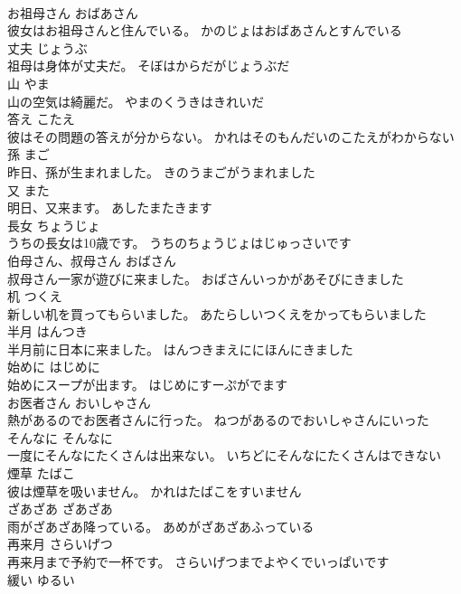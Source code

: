 \documentclass[8pt]{extreport}
\begin{document}
\begin{CJK}{UTF8}{min}
\\	お祖母さん	おばあさん	
\\	彼女はお祖母さんと住んでいる。	かのじょはおばあさんとすんでいる	
\\	丈夫	じょうぶ	
\\	祖母は身体が丈夫だ。	そぼはからだがじょうぶだ	
\\	山	やま	
\\	山の空気は綺麗だ。	やまのくうきはきれいだ	
\\	答え	こたえ	
\\	彼はその問題の答えが分からない。	かれはそのもんだいのこたえがわからない	
\\	孫	まご	
\\	昨日、孫が生まれました。	きのうまごがうまれました	
\\	又	また	
\\	明日、又来ます。	あしたまたきます	
\\	長女	ちょうじょ	
\\	うちの長女は10歳です。	うちのちょうじょはじゅっさいです	
\\	伯母さん、叔母さん	おばさん	
\\	叔母さん一家が遊びに来ました。	おばさんいっかがあそびにきました	
\\	机	つくえ	
\\	新しい机を買ってもらいました。	あたらしいつくえをかってもらいました	
\\	半月	はんつき	
\\	半月前に日本に来ました。	はんつきまえににほんにきました	
\\	始めに	はじめに	
\\	始めにスープが出ます。	はじめにすーぷがでます	
\\	お医者さん	おいしゃさん	
\\	熱があるのでお医者さんに行った。	ねつがあるのでおいしゃさんにいった	
\\	そんなに	そんなに	
\\	一度にそんなにたくさんは出来ない。	いちどにそんなにたくさんはできない	
\\	煙草	たばこ	
\\	彼は煙草を吸いません。	かれはたばこをすいません	
\\	ざあざあ	ざあざあ	
\\	雨がざあざあ降っている。	あめがざあざあふっている	
\\	再来月	さらいげつ	
\\	再来月まで予約で一杯です。	さらいげつまでよやくでいっぱいです	
\\	緩い	ゆるい	

\end{CJK}
\end{document}
